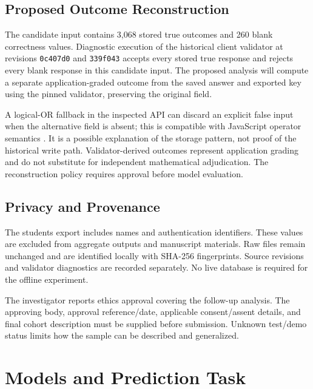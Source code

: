 \documentclass[conference]{IEEEtran}
\newif\ifworkingdraft
\newcommand{\draftnote}[1]{\ifworkingdraft\par\noindent\textcolor{red}{\textbf{Author review:} #1}\par\fi}
\begin{document}
\subsection{Proposed Outcome Reconstruction}
The candidate input contains 3,068 stored true outcomes and 260 blank correctness values. Diagnostic execution of the historical client validator at revisions \texttt{0c407d0} and \texttt{339f043} accepts every stored true response and rejects every blank response in this candidate input. The proposed analysis will compute a separate application-graded outcome from the saved answer and exported key using the pinned validator, preserving the original field.

A logical-OR fallback in the inspected API can discard an explicit false input when the alternative field is absent; this is compatible with JavaScript operator semantics \cite{mdnOR}. It is a possible explanation of the storage pattern, not proof of the historical write path. Validator-derived outcomes represent application grading and do not substitute for independent mathematical adjudication. The reconstruction policy requires approval before model evaluation.

\subsection{Privacy and Provenance}
The students export includes names and authentication identifiers. These values are excluded from aggregate outputs and manuscript materials. Raw files remain unchanged and are identified locally with SHA-256 fingerprints. Source revisions and validator diagnostics are recorded separately. No live database is required for the offline experiment.

The investigator reports ethics approval covering the follow-up analysis. The approving body, approval reference/date, applicable consent/assent details, and final cohort description must be supplied before submission. Unknown test/demo status limits how the sample can be described and generalized.
\draftnote{Complete ethics and cohort details from actual records. Do not describe the 92 active account IDs as independently verified participants without the relevant evidence.}

\section{Models and Prediction Task}
\end{document}

